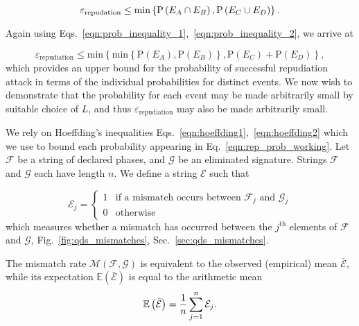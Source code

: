\begin{equation}
\varepsilon_{\text{repudation}} \le \text{min}\left\{\text{P}\left(E_A \cap E_B\right), \text{P}\left(E_C \cup E_D\right)\right\}. \notag
\end{equation}

\noindent Again using Eqs.~\ref{eqn:prob_inequality_1},~\ref{eqn:prob_inequality_2}, we arrive at

\begin{equation}\label{eqn:rep_prob_working}
\varepsilon_{\text{repudiation}} \le \text{min}\left\{
\text{min}\left\{\text{P}\left(E_A\right), \text{P}\left(E_B\right) \right\}, \text{P}\left(E_C\right) + \text{P}\left(E_D\right)\right\},
\end{equation}
which provides an upper bound for the probability of successful repudiation attack in terms of the individual probabilities for distinct events. We now wish to demonstrate that the probability for each event may be made arbitrarily small by suitable choice of $L$, and thus $\varepsilon_{\text{repudiation}}$ may also be made arbitrarily small.


We rely on Hoeffding's inequalities Eqs.~\ref{eqn:hoeffding1},~\ref{eqn:hoeffding2} which we use to bound each probability appearing in Eq.~\ref{eqn:rep_prob_working}. Let $\mathcal{F}$ be a string of declared phases, and $\mathcal{G}$ be an eliminated signature. Strings $\mathcal{F}$ and $\mathcal{G}$ each have length $n$. We define a string $\mathcal{E}$ such that

\begin{equation*}\label{eqn:error_qds}
\mathcal{E}_j = 
\begin{cases}
1 & \text{if a mismatch occurs between $\mathcal{F}_j$ and $\mathcal{G}_j$} \\
0 & \text{otherwise}
\end{cases}
\end{equation*}
which measures whether a mismatch has occurred between the $j^\text{th}$ elements of $\mathcal{F}$ and $\mathcal{G}$, Fig.~\ref{fig:qds_mismatches}, Sec.~\ref{sec:qds_mismatches}.


The mismatch rate $\mathcal{M}\left(\mathcal{F}, \mathcal{G}\right)$ is equivalent to the observed (empirical) mean $\bar{\mathcal{E}}$, while its expectation $\mathbb{E}\left(\bar{\mathcal{E}}\right)$ is equal to the arithmetic mean
\begin{equation}
\mathbb{E}\left(\bar{\mathcal{E}}\right) = \frac{1}{n} \sum_{j=1}^n \mathcal{E}_j. \notag
\end{equation}

